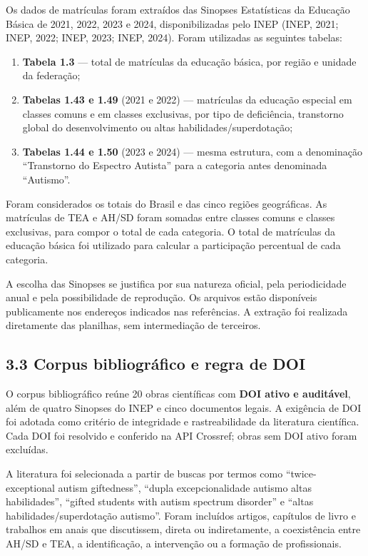 Os dados de matrículas foram extraídos das Sinopses Estatísticas da
Educação Básica de 2021, 2022, 2023 e 2024, disponibilizadas pelo INEP
(INEP, 2021; INEP, 2022; INEP, 2023; INEP, 2024). Foram utilizadas as
seguintes tabelas:

\begin{enumerate}
\def\labelenumi{\alph{enumi})}
\item
  \textbf{Tabela 1.3} --- total de matrículas da educação básica, por
  região e unidade da federação;
\item
  \textbf{Tabelas 1.43 e 1.49} (2021 e 2022) --- matrículas da educação
  especial em classes comuns e em classes exclusivas, por tipo de
  deficiência, transtorno global do desenvolvimento ou altas
  habilidades/superdotação;
\item
  \textbf{Tabelas 1.44 e 1.50} (2023 e 2024) --- mesma estrutura, com a
  denominação ``Transtorno do Espectro Autista'' para a categoria antes
  denominada ``Autismo''.
\end{enumerate}

Foram considerados os totais do Brasil e das cinco regiões geográficas.
As matrículas de TEA e AH/SD foram somadas entre classes comuns e
classes exclusivas, para compor o total de cada categoria. O total de
matrículas da educação básica foi utilizado para calcular a participação
percentual de cada categoria.

A escolha das Sinopses se justifica por sua natureza oficial, pela
periodicidade anual e pela possibilidade de reprodução. Os arquivos
estão disponíveis publicamente nos endereços indicados nas referências.
A extração foi realizada diretamente das planilhas, sem intermediação de
terceiros.

\subsection{3.3 Corpus bibliográfico e regra de
DOI}\label{corpus-bibliogruxe1fico-e-regra-de-doi}

O corpus bibliográfico reúne 20 obras científicas com \textbf{DOI ativo
e auditável}, além de quatro Sinopses do INEP e cinco documentos legais.
A exigência de DOI foi adotada como critério de integridade e
rastreabilidade da literatura científica. Cada DOI foi resolvido e
conferido na API Crossref; obras sem DOI ativo foram excluídas.

A literatura foi selecionada a partir de buscas por termos como
``twice-exceptional autism giftedness'', ``dupla excepcionalidade
autismo altas habilidades'', ``gifted students with autism spectrum
disorder'' e ``altas habilidades/superdotação autismo''. Foram incluídos
artigos, capítulos de livro e trabalhos em anais que discutissem, direta
ou indiretamente, a coexistência entre AH/SD e TEA, a identificação, a
intervenção ou a formação de profissionais.

